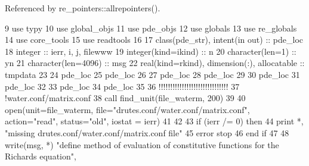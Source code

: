 Referenced by re\+\_\+pointers\+::allrepointers().


\begin{DoxyCode}
9       \textcolor{keywordtype}{use }typy
10       \textcolor{keywordtype}{use }global_objs
11       \textcolor{keywordtype}{use }pde_objs
12       \textcolor{keywordtype}{use }globals
13       \textcolor{keywordtype}{use }re_globals
14       \textcolor{keywordtype}{use }core_tools
15       \textcolor{keywordtype}{use }readtools
16       
17       \textcolor{keywordtype}{class}(pde_str), \textcolor{keywordtype}{intent(in out)} :: pde\_loc
18       \textcolor{keywordtype}{integer} :: ierr, i, j, filewww
19       \textcolor{keywordtype}{integer(kind=ikind)} :: n
20       \textcolor{keywordtype}{character(len=1)} :: yn
21       \textcolor{keywordtype}{character(len=4096)} :: msg
22       \textcolor{keywordtype}{real(kind=rkind)}, \textcolor{keywordtype}{dimension(:)}, \textcolor{keywordtype}{allocatable} :: tmpdata
23 
24       pde\_loc%
25       pde\_loc%
26 
27       pde\_loc%
28       pde\_loc%
29 
30       pde\_loc%
31       pde\_loc%
32 
33       pde\_loc%
34       pde\_loc%
35 
36       \textcolor{comment}{!!!!!!!!!!!!!!!!!!!!!!!!!!!!!!}
37       \textcolor{comment}{!water.conf/matrix.conf}
38       \textcolor{keyword}{call }find_unit(file_waterm, 200)
39 
40       \textcolor{keyword}{open}(unit=file_waterm, file=\textcolor{stringliteral}{"drutes.conf/water.conf/matrix.conf"}, action\textcolor{comment}{=}\textcolor{stringliteral}{"read"}\textcolor{comment}{, status=}\textcolor{stringliteral}{"old"}\textcolor{comment}{, iostat
       = ierr)}
41 \textcolor{comment}{}
42 \textcolor{comment}{      }
43 \textcolor{comment}{      }\textcolor{keywordflow}{if} (ierr /= 0) \textcolor{keywordflow}{then}
44         print *, \textcolor{stringliteral}{"missing drutes.conf/water.conf/matrix.conf file"}
45         error stop
46 \textcolor{keywordflow}{      end if}
47       
48       \textcolor{keyword}{write}(msg, *) \textcolor{stringliteral}{"define method of evaluation of constitutive functions for the Richards equation"}\textcolor{comment}{, 
}
\end{DoxyCode}
